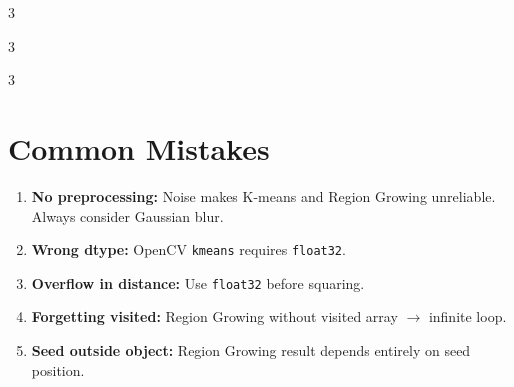 \documentclass[9pt,landscape,a4paper]{extarticle}
\begin{document}
\begin{multicols*}{3}
\begin{multicols*}{3}
\begin{multicols}{3}
\section{Common Mistakes}

\begin{notebox}
\begin{enumerate}
  \item \textbf{No preprocessing:} Noise makes K-means and Region Growing unreliable. Always consider Gaussian blur.
  \item \textbf{Wrong dtype:} OpenCV \texttt{kmeans} requires \texttt{float32}.
  \item \textbf{Overflow in distance:} Use \texttt{float32} before squaring.
  \item \textbf{Forgetting visited:} Region Growing without visited array $\to$ infinite loop.
  \item \textbf{Seed outside object:} Region Growing result depends entirely on seed position.
\end{enumerate}
\end{notebox}

\end{multicols}

\end{multicols*}

\end{multicols*}
\end{document}
